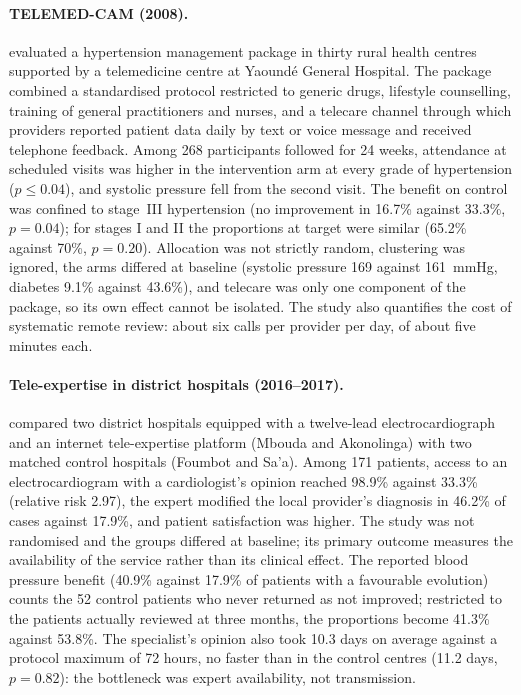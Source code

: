 \paragraph{TELEMED-CAM (2008).} \Textcite{kingue2013} evaluated a hypertension management package in thirty rural health centres supported by a telemedicine centre at Yaoundé General Hospital. The package combined a standardised protocol restricted to generic drugs, lifestyle counselling, training of general practitioners and nurses, and a telecare channel through which providers reported patient data daily by text or voice message and received telephone feedback. Among 268 participants followed for 24 weeks, attendance at scheduled visits was higher in the intervention arm at every grade of hypertension ($p \leq 0.04$), and systolic pressure fell from the second visit. The benefit on control was confined to stage~III hypertension (no improvement in 16.7\% against 33.3\%, $p = 0.04$); for stages I and II the proportions at target were similar (65.2\% against 70\%, $p = 0.20$). Allocation was not strictly random, clustering was ignored, the arms differed at baseline (systolic pressure 169 against 161~mmHg, diabetes 9.1\% against 43.6\%), and telecare was only one component of the package, so its own effect cannot be isolated. The study also quantifies the cost of systematic remote review: about six calls per provider per day, of about five minutes each.

\paragraph{Tele-expertise in district hospitals (2016--2017).} \Textcite{bediang2021} compared two district hospitals equipped with a twelve-lead electrocardiograph and an internet tele-expertise platform (Mbouda and Akonolinga) with two matched control hospitals (Foumbot and Sa'a). Among 171 patients, access to an electrocardiogram with a cardiologist's opinion reached 98.9\% against 33.3\% (relative risk 2.97), the expert modified the local provider's diagnosis in 46.2\% of cases against 17.9\%, and patient satisfaction was higher. The study was not randomised and the groups differed at baseline; its primary outcome measures the availability of the service rather than its clinical effect. The reported blood pressure benefit (40.9\% against 17.9\% of patients with a favourable evolution) counts the 52 control patients who never returned as not improved; restricted to the patients actually reviewed at three months, the proportions become 41.3\% against 53.8\%. The specialist's opinion also took 10.3 days on average against a protocol maximum of 72 hours, no faster than in the control centres (11.2 days, $p = 0.82$): the bottleneck was expert availability, not transmission.

